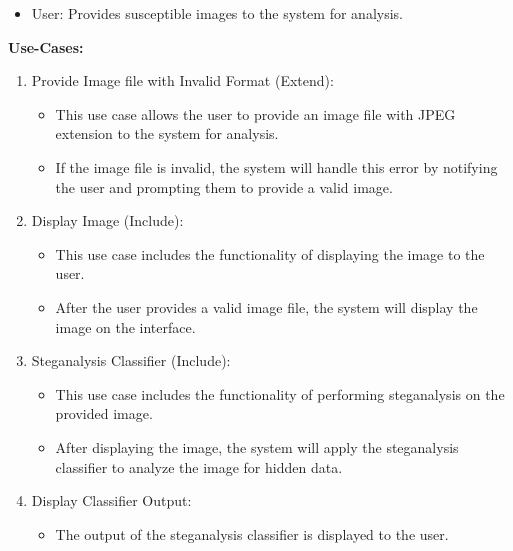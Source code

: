 \begin{itemize}[noitemsep]
    \item User: Provides susceptible images to the system for analysis.
\end{itemize}
\begin{flushleft}
\large{\textbf{Use-Cases:}}
\end{flushleft}
\begin{enumerate}[noitemsep]
    \item Provide Image file with Invalid Format (Extend):
    \begin{itemize}
        \item This use case allows the user to provide an image file with JPEG extension to the system for analysis.
        \item If the image file is invalid, the system will handle this error by notifying the user and prompting them to provide a valid image.
    \end{itemize}
    \item Display Image (Include):
    \begin{itemize}
        \item This use case includes the functionality of displaying the image to the user.
        \item After the user provides a valid image file, the system will display the image on the interface.
    \end{itemize}
    
    \item Steganalysis Classifier (Include):
    \begin{itemize}
        \item This use case includes the functionality of performing steganalysis on the provided image.
        \item After displaying the image, the system will apply the steganalysis classifier to analyze the image for hidden data.
    \end{itemize}
    
    \item Display Classifier Output:
    \begin{itemize}
        \item The output of the steganalysis classifier is displayed to the user.
    \end{itemize}
\end{enumerate}
\clearpage
